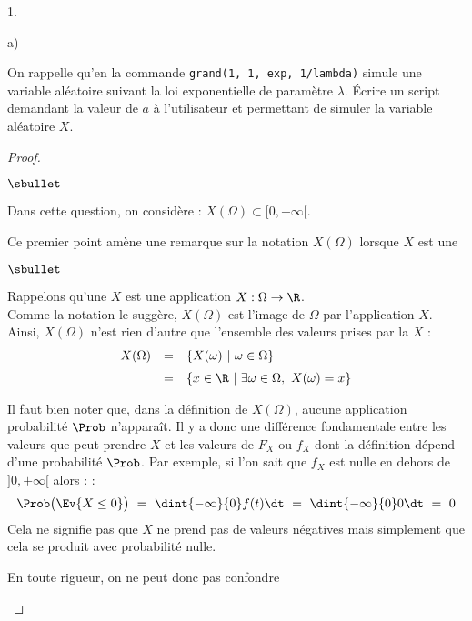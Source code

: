 \begin{noliste}{1.}
\begin{noliste}{a)}
  \item On rappelle qu'en \Scilab{} la commande {\tt grand(1, 1,
      \ttq{}exp\ttq{}, 1/lambda)} simule une variable aléatoire
    suivant la loi exponentielle de paramètre $\lambda$. Écrire un
    script \Scilab{} demandant la valeur de $a$ à l'utilisateur et
    permettant de simuler la variable aléatoire $X$.
    
    \begin{proof}~%
      \begin{noliste}{$\sbullet$}
      \item Dans cette question, on considère : $X(\Omega) \subset [0,
        +\infty[$.
        \begin{remark}%
          Ce premier point amène une remarque sur la notation
          $X(\Omega)$ lorsque $X$ est une \var
          \begin{noliste}{$\sbullet$}
          \item Rappelons qu'une \var $X$ est une application $X :
            \Omega \to \R$.\\
            Comme la notation le suggère, $X(\Omega)$ est l'image de
            $\Omega$ par l'application $X$. \\
            Ainsi, $X(\Omega)$ n'est rien d'autre que l'ensemble des
            valeurs prises par la \var $X$ :
            \[
            \begin{array}{rcl}
              X(\Omega) & = & \{ X(\omega) \ | \ \omega \in \Omega\}
              \\[.2cm]
              & = & \{ x \in \R \ | \ \exists \omega \in \Omega, \ X(\omega) =
              x \}
            \end{array}
            \]
          \item Il faut bien noter que, dans la définition de
            $X(\Omega)$, aucune application probabilité $\Prob$
            n'apparaît. Il y a donc une différence fondamentale entre
            les valeurs que peut prendre $X$ et les valeurs de $F_X$
            ou $f_X$ dont la définition dépend d'une probabilité
            $\Prob$. Par exemple, si l'on sait que $f_X$ est nulle en
            dehors de $]0, +\infty[$ alors : :
            \[
            \Prob\big(\Ev{X \leq 0} \big) \ = \ \dint{-\infty}{0} f(t)
            \dt \ = \ \dint{-\infty}{0} 0 \dt \ = \ 0
            \]
            Cela ne signifie pas que $X$ ne prend pas de valeurs
            négatives mais simplement que cela se produit avec
            probabilité nulle.
          \item En toute rigueur, on ne peut donc pas confondre

\end{noliste}
\end{remark}
\end{noliste}
\end{proof}
\end{noliste}
\end{noliste}

